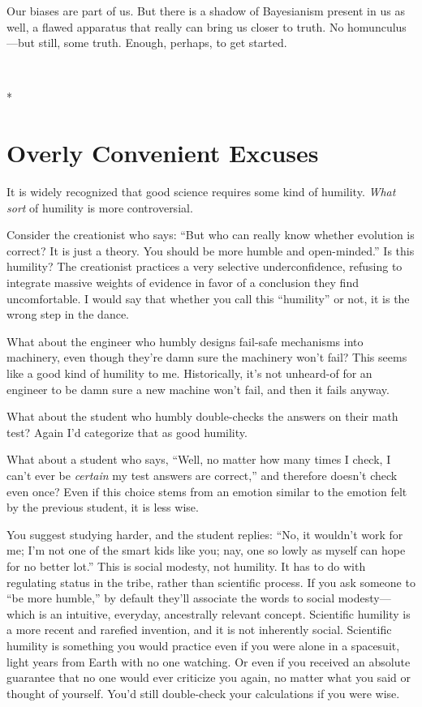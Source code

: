 {
 Our biases are part of us. But there is a shadow of Bayesianism
present in us as well, a flawed apparatus that really can bring us
closer to truth. No homunculus---but still, some truth. Enough,
perhaps, to get started.}

{
 ~}

{\centering
 *
\par}


\bigskip

\chapter{Overly Convenient Excuses}


{
 It is widely recognized that good science requires some kind of
humility. \textit{What sort} of humility is more controversial. }

{
 Consider the creationist who says: ``But who can
really know whether evolution is correct? It is just a theory. You
should be more humble and open-minded.'' Is this
humility? The creationist practices a very selective underconfidence,
refusing to integrate massive weights of evidence in favor of a
conclusion they find uncomfortable. I would say that whether you call
this ``humility'' or not, it is the
wrong step in the dance.}

{
 What about the engineer who humbly designs fail-safe mechanisms
into machinery, even though they're damn sure the
machinery won't fail? This seems like a good kind of
humility to me. Historically, it's not unheard-of for
an engineer to be damn sure a new machine won't fail,
and then it fails anyway.}

{
 What about the student who humbly double-checks the answers on
their math test? Again I'd categorize that as good
humility.}

{
 What about a student who says, ``Well, no matter
how many times I check, I can't ever be
\textit{certain} my test answers are correct,'' and
therefore doesn't check even once? Even if this choice
stems from an emotion similar to the emotion felt by the previous
student, it is less wise.}

{
 You suggest studying harder, and the student replies:
``No, it wouldn't work for me;
I'm not one of the smart kids like you; nay, one so
lowly as myself can hope for no better lot.'' This is
social modesty, not humility. It has to do with regulating status in
the tribe, rather than scientific process. If you ask someone to
``be more humble,'' by default
they'll associate the words to social modesty---which
is an intuitive, everyday, ancestrally relevant concept. Scientific
humility is a more recent and rarefied invention, and it is not
inherently social. Scientific humility is something you would practice
even if you were alone in a spacesuit, light years from Earth with no
one watching. Or even if you received an absolute guarantee that no one
would ever criticize you again, no matter what you said or thought of
yourself. You'd still double-check your calculations if
you were wise.}

